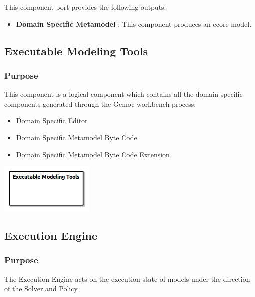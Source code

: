 \documentclass{gemoc} %
\begin{document}
This component port provides the following outputs:
\begin{itemize}
  \item \textbf{Domain Specific Metamodel} :
This component produces an ecore model.
\end{itemize}


\subsection{Executable Modeling Tools}


\subsubsection{Purpose}
This component is a logical component which contains all the domain specific components generated through the Gemoc workbench process:  
\begin{itemize}
\item Domain Specific Editor
\item Domain Specific Metamodel Byte Code
\item Domain Specific Metamodel Byte Code Extension
\end{itemize}

\begin{center}
\includegraphics*[trim=0.0cm 0.0cm 0cm 0.0cm, clip=true]{../images/generated/Generated_Executable_Modeling_Tools.png}
\end{center}




\subsection{Execution Engine}


\subsubsection{Purpose}
The Execution Engine acts on the execution state of models under the direction of the Solver and Policy.
\end{document}
